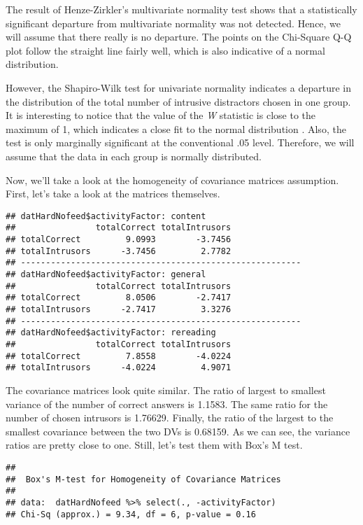 \documentclass[12pt,]{article}
\begin{document}
The result of Henze-Zirkler's multivariate normality test shows that a
statistically significant departure from multivariate normality was not
detected. Hence, we will assume that there really is no departure. The
points on the Chi-Square Q-Q plot follow the straight line fairly well,
which is also indicative of a normal distribution.

However, the Shapiro-Wilk test for univariate normality indicates a
departure in the distribution of the total number of intrusive
distractors chosen in one group. It is interesting to notice that the
value of the \emph{W} statistic is close to the maximum of 1, which
indicates a close fit to the normal distribution
\citep{salkind_encyclopedia_2007}. Also, the test is only marginally
significant at the conventional .05 level. Therefore, we will assume
that the data in each group is normally distributed.

Now, we'll take a look at the homogeneity of covariance matrices
assumption. First, let's take a look at the matrices themselves.

\begin{verbatim}
## datHardNofeed$activityFactor: content
##                totalCorrect totalIntrusors
## totalCorrect         9.0993        -3.7456
## totalIntrusors      -3.7456         2.7782
## -------------------------------------------------------- 
## datHardNofeed$activityFactor: general
##                totalCorrect totalIntrusors
## totalCorrect         8.0506        -2.7417
## totalIntrusors      -2.7417         3.3276
## -------------------------------------------------------- 
## datHardNofeed$activityFactor: rereading
##                totalCorrect totalIntrusors
## totalCorrect         7.8558        -4.0224
## totalIntrusors      -4.0224         4.9071
\end{verbatim}

The covariance matrices look quite similar. The ratio of largest to
smallest variance of the number of correct answers is 1.1583. The same
ratio for the number of chosen intrusors is 1.76629. Finally, the ratio
of the largest to the smallest covariance between the two DVs is
0.68159. As we can see, the variance ratios are pretty close to one.
Still, let's test them with Box's M test.

\begin{verbatim}
## 
##  Box's M-test for Homogeneity of Covariance Matrices
## 
## data:  datHardNofeed %>% select(., -activityFactor)
## Chi-Sq (approx.) = 9.34, df = 6, p-value = 0.16
\end{verbatim}
\end{document}
